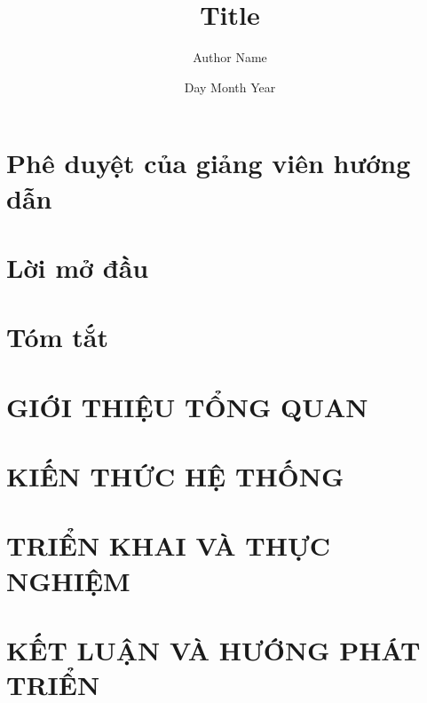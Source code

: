 \documentclass[12pt]{extreport}
\title{Title}
\author{Author Name}
\date{Day Month Year}
\begin{document}
\maketitle


\chapter*{Phê duyệt của giảng viên hướng dẫn}


\chapter*{Lời mở đầu}


\chapter*{Tóm tắt}


\tableofcontents

\listoffigures

\listoftables

\chapter{GIỚI THIỆU TỔNG QUAN}


\chapter{KIẾN THỨC HỆ THỐNG}


\chapter{TRIỂN KHAI VÀ THỰC NGHIỆM}


\chapter{KẾT LUẬN VÀ HƯỚNG PHÁT TRIỂN}

\end{document}

